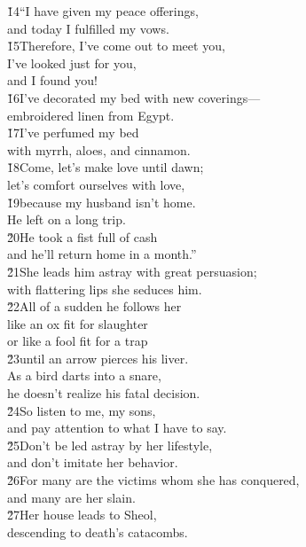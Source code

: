 \begin{poetry}
\poeml \v{14}``I have given my peace offerings, \\
\poemll    and today I fulfilled my vows. \\
\poeml \v{15}Therefore, I've come out to meet you, \\
\poemll    I've looked just for you, \\
\poemlll       and I found you! \\
\poeml \v{16}I've decorated my bed with new coverings--- \\
\poemll    embroidered linen from Egypt. \\
\poeml \v{17}I've perfumed my bed \\
\poemll    with myrrh, aloes, and cinnamon. \\
\poeml \v{18}Come, let's make love until dawn; \\
\poemll    let's comfort ourselves with love, \\
\poeml \v{19}because my husband isn't home. \\
\poemll    He left on a long trip. \\
\poeml \v{20}He took a fist full of cash \\
\poemll    and he'll return home in a month.'' \\
\poeml \v{21}She leads him astray with great persuasion; \\
\poemll    with flattering lips she seduces him. \\
\poeml \v{22}All of a sudden he follows her \\
\poemll    like an ox fit for slaughter \\
\poemlll       or like a fool fit for a trap \\
\poeml \v{23}until an arrow pierces his liver. \\
\poemll    As a bird darts into a snare, \\
\poemlll       he doesn't realize his fatal decision. \\
\poeml \v{24}So listen to me, my sons, \\
\poemll    and pay attention to what I have to say. \\
\poeml \v{25}Don't be led astray by her lifestyle, \\
\poemll    and don't imitate her behavior. \\
\poeml \v{26}For many are the victims whom she has conquered, \\
\poemll    and many are her slain. \\
\poeml \v{27}Her house leads to Sheol, \\
\poemll    descending to death's catacombs.
\end{poetry}

